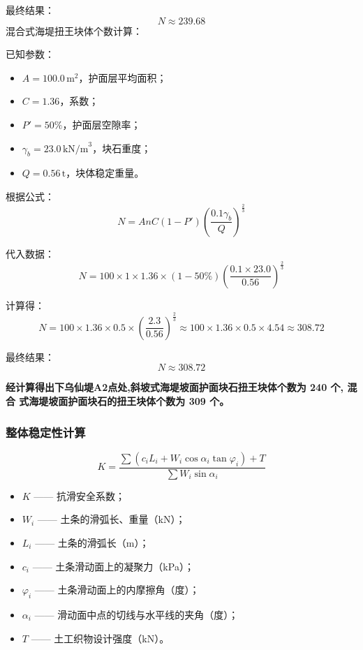 \documentclass[UTF8, a4paper, 12pt]{ctexart} %
\begin{document}
最终结果：
\[
N \approx 239.68
\]
混合式海堤扭王块体个数计算：

已知参数：
\begin{itemize}
    \item $A = 100.0\,\text{m}^2$，护面层平均面积；
    \item $C = 1.36$，系数；
    \item $P' = 50\%$，护面层空隙率；
    \item $\gamma_b = 23.0\,\text{kN/m}^3$，块石重度；
    \item $Q = 0.56\,\text{t}$，块体稳定重量。
\end{itemize}

根据公式：
\begin{equation}
    N = A n C (1 - P') \left( \frac{0.1 \gamma_b}{Q} \right)^{\frac{2}{3}}
\end{equation}

代入数据：
\begin{equation}
    N = 100 \times 1 \times 1.36 \times (1 - 50\%) \left( \frac{0.1 \times 23.0}{0.56} \right)^{\frac{2}{3}}
\end{equation}

计算得：
\begin{equation}
    N = 100 \times 1.36 \times 0.5 \times \left( \frac{2.3}{0.56} \right)^{\frac{2}{3}} \approx 100 \times 1.36 \times 0.5 \times 4.54 \approx 308.72
\end{equation}

最终结果：
\[
N \approx 308.72
\]




\textbf{经计算得出下乌仙堤A2点处,斜坡式海堤坡面护面块石扭王块体个数为 240 个, 混合
式海堤坡面护面块石的扭王块体个数为 309 个。}
\par
\subsubsection{整体稳定性计算}
\begin{equation}
    K = \frac{\sum \left( c_i L_i + W_i \cos \alpha_i \tan \varphi_i \right) + T}{\sum W_i \sin \alpha_i}
\end{equation}
\begin{itemize}
        \item $K$ —— 抗滑安全系数；
        \item $W_i$ —— 土条的滑弧长、重量（kN）；
        \item $L_i$ —— 土条的滑弧长（m）；
        \item $c_i$ —— 土条滑动面上的凝聚力（kPa）；
        \item $\varphi_i$ —— 土条滑动面上的内摩擦角（度）；
        \item $\alpha_i$ —— 滑动面中点的切线与水平线的夹角（度）；
        \item $T$ —— 土工织物设计强度（kN）。
\end{itemize}
\end{document}

